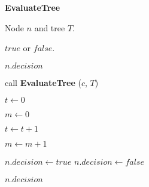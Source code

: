 \documentclass[final,5p,times,twocolumn]{elsarticle}
\newcommand{\algofontsize}{\fontsize{7}{8}\selectfont}
\begin{document}
\begin{algorithm}[htp]

{\algofontsize
\caption{\textbf{EvaluateTree}}

\label{algo:evaluate-tree}

\begin{algorithmic}[1]

\REQUIRE Node $n$ and tree $T$.

\ENSURE $\mathit{true}$ or $\mathit{false}$.

\medskip

 \label{line:evaluate-tree-if-null}
	\RETURN $n.decision$ \label{line:evaluate-tree-decision-not-null}
\ENDIF

 \label{line:evaluate-tree-child-loop}
	
	\STATE call \textbf{EvaluateTree} ($c$, $T$) {\algofontsize {}} \label{line:evaluate-tree-call}
	
\ENDFOR

\STATE $t \leftarrow 0$ \label{line:evaluate-tree-init-t}

\STATE $m \leftarrow 0$ \label{line:evaluate-tree-init-m}

 \label{line:evaluate-tree-count-loop}

	\STATE $t \leftarrow t + 1$ \label{line:evaluate-tree-inc-t}
	
	 \label{line:evaluate-tree-find-decision}
		\STATE $m \leftarrow m + 1$ \label{line:evaluate-tree-inc-m}
	\ENDIF

\ENDFOR

 \label{line:evaluate-tree-find-gate}
	\STATE $n.decision \leftarrow true$ \label{line:evaluate-tree-set-decision-true}
\ELSE
	\STATE $n.decision \leftarrow false$ \label{line:evaluate-tree-set-decision-false}
\ENDIF

\RETURN $n.decision$ \label{line:evaluate-tree-return-decision}

\end{algorithmic}

}

\end{algorithm}
\end{document}
